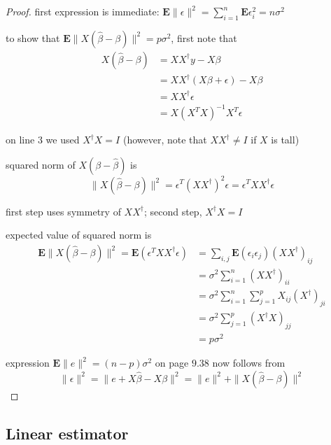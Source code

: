 \begin{proof}
    first expression is immediate: $ \mathbf{E}\|\epsilon\|^{2}=\sum_{i=1}^{n} \mathbf{E} \epsilon_{i}^{2}=n \sigma^{2} $

    to show that $ \mathbf{E}\|X(\hat{\beta}-\beta)\|^{2}=p \sigma^{2} $, first note that
$$
\begin{aligned}
X(\hat{\beta}-\beta) &=X X^{\dagger} y-X \beta \\
&=X X^{\dagger}(X \beta+\epsilon)-X \beta \\
&=X X^{\dagger} \epsilon \\
&=X\left(X^{T} X\right)^{-1} X^{T} \epsilon
\end{aligned}
$$

on line 3 we used $ X^{\dagger} X=I $ (however, note that $ X X^{\dagger} \neq I $ if $ X $ is tall)

\begin{theorem}
    squared norm of $ X(\beta-\hat{\beta}) $ is
$$
\|X(\hat{\beta}-\beta)\|^{2}=\epsilon^{T}\left(X X^{\dagger}\right)^{2} \epsilon=\epsilon^{T} X X^{\dagger} \epsilon
$$
\end{theorem}

first step uses symmetry of $ X X^{\dagger} $; second step, $ X^{\dagger} X=I $

expected value of squared norm is
$$
\begin{aligned}
\mathbf{E}\|X(\hat{\beta}-\beta)\|^{2}=\mathbf{E}\left(\epsilon^{T} X X^{\dagger} \epsilon\right) &=\sum_{i, j} \mathbf{E}\left(\epsilon_{i} \epsilon_{j}\right)\left(X X^{\dagger}\right)_{i j} \\
&=\sigma^{2} \sum_{i=1}^{n}\left(X X^{\dagger}\right)_{i i} \\
&=\sigma^{2} \sum_{i=1}^{n} \sum_{j=1}^{p} X_{i j}\left(X^{\dagger}\right)_{j i} \\
&=\sigma^{2} \sum_{j=1}^{p}\left(X^{\dagger} X\right)_{j j} \\
&=p \sigma^{2}
\end{aligned}
$$

expression $ \mathbf{E}\|e\|^{2}=(n-p) \sigma^{2} $ on page $ 9.38 $ now follows from
$$
\|\epsilon\|^{2}=\|e+X \hat{\beta}-X \beta\|^{2}=\|e\|^{2}+\|X(\hat{\beta}-\beta)\|^{2}
$$
\end{proof}


\subsection{Linear estimator}


